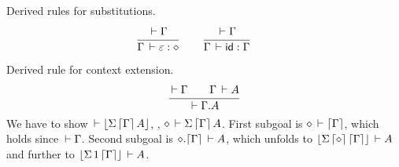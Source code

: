 \documentclass{article}
\newcommand{\eps}{\varepsilon}
\newcommand{\emp}{\eps}
\newcommand{\ty}[1]{\lceil #1 \rceil}
\renewcommand{\cxt}[1]{\lfloor #1 \rfloor}
\newcommand{\SigT}[2]{\Sigma\,#1\,#2}
\renewcommand{\cempty}{\diamond}
\begin{document}
Derived rules for substitutions.
\begin{gather*}
  \ru{\der \Gamma
    }{\Gamma \der \emp : \cempty}
\qquad
  \ru{\der \Gamma
    }{\Gamma \der \tid : \Gamma}
\qquad
\end{gather*}

Derived rule for context extension.
\[
  \ru{\der \Gamma \qquad
      \Gamma \der A
    }{\der \cext \Gamma A}
\]
We have to show $\der \cxt{\SigT{\ty\Gamma}A}$, \ie,
$\cempty \der \SigT{\ty\Gamma} A$.  First subgoal is
$\cempty \der \ty\Gamma$, which holds since $\,\vdash \Gamma$.
Second subgoal is $\cext \cempty {\ty\Gamma} \der A$,
which unfolds to $\cxt{\SigT{\ty \cempty} {\ty\Gamma}} \der A$
and further to $\cxt{\SigT 1 {\ty\Gamma}} \der A$.
\end{document}
